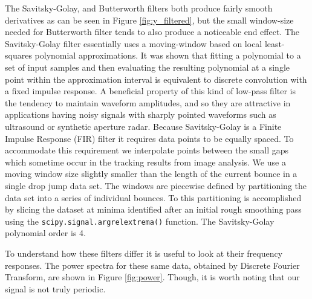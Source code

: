 \documentclass[12pt,a4paper,oneside]{book}
\begin{document}
The Savitsky-Golay, and Butterworth filters both produce fairly smooth derivatives as can be seen in Figure \ref{fig:y_filtered}, but the small window-size needed for Butterworth filter tends to also produce a noticeable end effect. The Savitsky-Golay filter essentially uses a moving-window based on local least-squares polynomial approximations. It was shown that fitting a polynomial to a set of input samples and then evaluating the resulting polynomial at a single point within the approximation interval is equivalent to discrete convolution with a fixed impulse response\cite{savitzky_smoothing_1964}. A beneficial property of this kind of low-pass filter is the tendency to maintain waveform amplitudes, and so they are attractive in applications having noisy signals with sharply pointed waveforms such as ultrasound or synthetic aperture radar\cite{schafer_what_2011}. Because Savitsky-Golay is a Finite Impulse Response (FIR) filter it requires data points to be equally spaced. To accommodate this requirement we interpolate points between the small gaps which sometime occur in the tracking results from image analysis. We use a moving window size slightly smaller than the length of the current bounce in a single drop jump data set. The windows are piecewise defined by partitioning the data set into a series of individual bounces. To this partitioning is accomplished by slicing the dataset at minima identified after an initial rough smoothing pass using the \verb|scipy.signal.argrelextrema()| function. The Savitsky-Golay polynomial order is 4. 

To understand how these filters differ it is useful to look at their frequency responses. The power spectra for these same data, obtained by Discrete Fourier Transform, are shown in Figure \ref{fig:power}. Though, it is worth noting that our signal is not truly periodic. 
\end{document}
